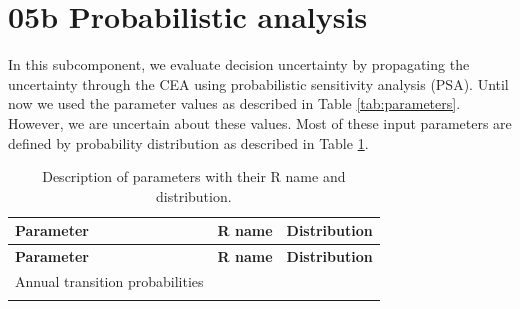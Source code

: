 \documentclass[]{book}
\begin{document}
\section{05b Probabilistic analysis}\label{Probabilistic-analysis}

In this subcomponent, we evaluate decision uncertainty by propagating
the uncertainty through the CEA using probabilistic sensitivity analysis
(PSA). Until now we used the parameter values as described in Table
\ref{tab:parameters}. However, we are uncertain about these values. Most
of these input parameters are defined by probability distribution as
described in Table \ref{tab:parameters-PSA}.

\begin{longtable}[]{@{}lll@{}}
\caption{\label{tab:parameters-PSA} Description of parameters with their R
name and distribution.}\tabularnewline
\toprule
\begin{minipage}[b]{0.33\columnwidth}\raggedright\strut
\textbf{Parameter}\strut
\end{minipage} & \begin{minipage}[b]{0.13\columnwidth}\raggedright\strut
\textbf{R name}\strut
\end{minipage} & \begin{minipage}[b]{0.45\columnwidth}\raggedright\strut
\textbf{Distribution}\strut
\end{minipage}\tabularnewline
\midrule
\endfirsthead
\toprule
\begin{minipage}[b]{0.33\columnwidth}\raggedright\strut
\textbf{Parameter}\strut
\end{minipage} & \begin{minipage}[b]{0.13\columnwidth}\raggedright\strut
\textbf{R name}\strut
\end{minipage} & \begin{minipage}[b]{0.45\columnwidth}\raggedright\strut
\textbf{Distribution}\strut
\end{minipage}\tabularnewline
\midrule
\endhead
\begin{minipage}[t]{0.33\columnwidth}\raggedright\strut
Annual transition probabilities\strut
\end{minipage} & \begin{minipage}[t]{0.13\columnwidth}\raggedright\strut
\strut
\end{minipage} & \begin{minipage}[t]{0.45\columnwidth}\raggedright\strut
\strut
\end{minipage}\tabularnewline
\begin{minipage}[t]{0.33\columnwidth}\raggedright\strut

\end{minipage}
\end{longtable}
\end{document}
